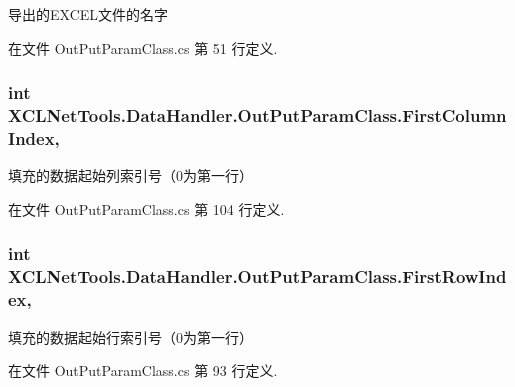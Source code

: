 导出的\-E\-X\-C\-E\-L文件的名字 



在文件 Out\-Put\-Param\-Class.\-cs 第 51 行定义.

\hypertarget{class_x_c_l_net_tools_1_1_data_handler_1_1_out_put_param_class_ad7f400014e22c2935b3acd107b700301}{
\subsubsection[{First\-Column\-Index}]{\setlength{\rightskip}{0pt plus 5cm}int X\-C\-L\-Net\-Tools.\-Data\-Handler.\-Out\-Put\-Param\-Class.\-First\-Column\-Index\hspace{0.3cm}{\ttfamily [get]}, {\ttfamily [set]}}}\label{class_x_c_l_net_tools_1_1_data_handler_1_1_out_put_param_class_ad7f400014e22c2935b3acd107b700301}


填充的数据起始列索引号（0为第一行） 



在文件 Out\-Put\-Param\-Class.\-cs 第 104 行定义.

\hypertarget{class_x_c_l_net_tools_1_1_data_handler_1_1_out_put_param_class_a2fce0d6591ecfcef5f4d469d5739e326}{
\subsubsection[{First\-Row\-Index}]{\setlength{\rightskip}{0pt plus 5cm}int X\-C\-L\-Net\-Tools.\-Data\-Handler.\-Out\-Put\-Param\-Class.\-First\-Row\-Index\hspace{0.3cm}{\ttfamily [get]}, {\ttfamily [set]}}}\label{class_x_c_l_net_tools_1_1_data_handler_1_1_out_put_param_class_a2fce0d6591ecfcef5f4d469d5739e326}


填充的数据起始行索引号（0为第一行） 



在文件 Out\-Put\-Param\-Class.\-cs 第 93 行定义.

